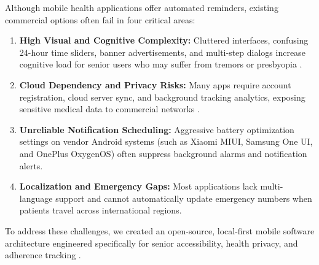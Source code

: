 \documentclass[10pt]{article}
\begin{document}
Although mobile health applications offer automated reminders, existing commercial options often fail in four critical areas:
\begin{enumerate}
    \item \textbf{High Visual and Cognitive Complexity:} Cluttered interfaces, confusing 24-hour time sliders, banner advertisements, and multi-step dialogs increase cognitive load for senior users who may suffer from tremors or presbyopia \cite{w3c2018wcag}.
    \item \textbf{Cloud Dependency and Privacy Risks:} Many apps require account registration, cloud server sync, and background tracking analytics, exposing sensitive medical data to commercial networks \cite{aosp2024offline}.
    \item \textbf{Unreliable Notification Scheduling:} Aggressive battery optimization settings on vendor Android systems (such as Xiaomi MIUI, Samsung One UI, and OnePlus OxygenOS) often suppress background alarms and notification alerts.
    \item \textbf{Localization and Emergency Gaps:} Most applications lack multi-language support and cannot automatically update emergency numbers when patients travel across international regions.
\end{enumerate}

To address these challenges, we created an open-source, local-first mobile software architecture engineered specifically for senior accessibility, health privacy, and adherence tracking \cite{dosezy2026github}.
\end{document}
